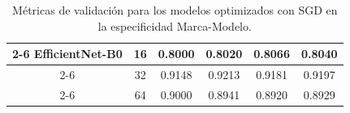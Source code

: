 \begin{table}[H]
\begin{adjustbox}
\begin{tabular}{|c|c|c|c|c|c|}
			\cline{2-6} EfficientNet-B0 & 16                      & 0.8000             & 0.8020             & 0.8066                & 0.8040            \\
			\cline{2-6}                 & 32                      & 0.9148             & 0.9213             & 0.9181                & 0.9197            \\
			\cline{2-6}                 & 64                      & 0.9000             & 0.8941             & 0.8920                & 0.8929            \\
			\hline
		\end{tabular}
	\end{adjustbox}
	\caption{Métricas de validación para los modelos optimizados con SGD en la
		especificidad Marca-Modelo.}
	\label{tab:sgd_metrics_mm}
\end{table}

